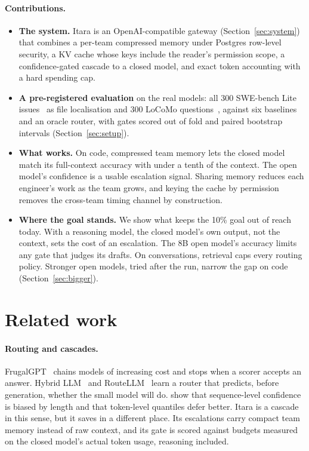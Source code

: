 \documentclass[10pt,twocolumn]{article}
\begin{document}
\paragraph{Contributions.}
\begin{itemize}
\item \textbf{The system.} Itara is an OpenAI-compatible gateway (Section~\ref{sec:system}) that combines a per-team compressed memory under Postgres row-level security, a KV cache whose keys include the reader's permission scope, a confidence-gated cascade to a closed model, and exact token accounting with a hard spending cap.
\item \textbf{A pre-registered evaluation} on the real models: all 300 SWE-bench Lite issues~\citep{jimenez2024swebench} as file localisation and 300 LoCoMo questions~\citep{maharana2024locomo}, against six baselines and an oracle router, with gates scored out of fold and paired bootstrap intervals (Section~\ref{sec:setup}).
\item \textbf{What works.} On code, compressed team memory lets the closed model match its full-context accuracy with under a tenth of the context. The open model's confidence is a usable escalation signal. Sharing memory reduces each engineer's work as the team grows, and keying the cache by permission removes the cross-team timing channel by construction.
\item \textbf{Where the goal stands.} We show what keeps the 10\% goal out of reach today. With a reasoning model, the closed model's own output, not the context, sets the cost of an escalation. The 8B open model's accuracy limits any gate that judges its drafts. On conversations, retrieval caps every routing policy. Stronger open models, tried after the run, narrow the gap on code (Section~\ref{sec:bigger}).
\end{itemize}

\section{Related work}
\label{sec:related}

\paragraph{Routing and cascades.} FrugalGPT~\citep{chen2023frugalgpt} chains models of increasing cost and stops when a scorer accepts an answer. Hybrid LLM~\citep{ding2024hybrid} and RouteLLM~\citep{ong2025routellm} learn a router that predicts, before generation, whether the small model will do. \citet{gupta2024cascades} show that sequence-level confidence is biased by length and that token-level quantiles defer better. Itara is a cascade in this sense, but it saves in a different place. Its escalations carry compact team memory instead of raw context, and its gate is scored against budgets measured on the closed model's actual token usage, reasoning included.
\end{document}
